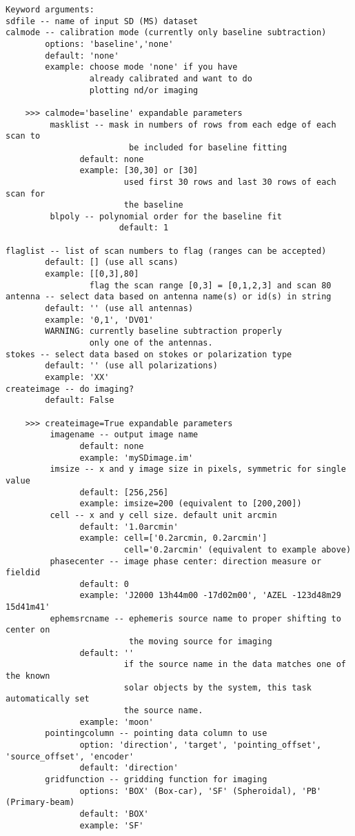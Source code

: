 \begin{verbatim}
Keyword arguments:
sdfile -- name of input SD (MS) dataset
calmode -- calibration mode (currently only baseline subtraction)
        options: 'baseline','none'
        default: 'none'
        example: choose mode 'none' if you have
                 already calibrated and want to do
                 plotting nd/or imaging 
    
    >>> calmode='baseline' expandable parameters
         masklist -- mask in numbers of rows from each edge of each scan to 
                         be included for baseline fitting
               default: none
               example: [30,30] or [30] 
                        used first 30 rows and last 30 rows of each scan for 
                        the baseline 
         blpoly -- polynomial order for the baseline fit
                       default: 1
                       
flaglist -- list of scan numbers to flag (ranges can be accepted)  
        default: [] (use all scans)
        example: [[0,3],80]
                 flag the scan range [0,3] = [0,1,2,3] and scan 80 
antenna -- select data based on antenna name(s) or id(s) in string
        default: '' (use all antennas)
        example: '0,1', 'DV01'
        WARNING: currently baseline subtraction properly 
                 only one of the antennas.
stokes -- select data based on stokes or polarization type 
        default: '' (use all polarizations)
        example: 'XX'
createimage -- do imaging? 
        default: False 
        
    >>> createimage=True expandable parameters
         imagename -- output image name
               default: none
               example: 'mySDimage.im'
         imsize -- x and y image size in pixels, symmetric for single value
               default: [256,256]
               example: imsize=200 (equivalent to [200,200])
         cell -- x and y cell size. default unit arcmin
               default: '1.0arcmin'
               example: cell=['0.2arcmin, 0.2arcmin']
                        cell='0.2arcmin' (equivalent to example above)
         phasecenter -- image phase center: direction measure or fieldid 
               default: 0
               example: 'J2000 13h44m00 -17d02m00', 'AZEL -123d48m29 15d41m41'
         ephemsrcname -- ephemeris source name to proper shifting to center on 
                         the moving source for imaging
               default: ''
                        if the source name in the data matches one of the known 
                        solar objects by the system, this task automatically set 
                        the source name. 
               example: 'moon' 
        pointingcolumn -- pointing data column to use
               option: 'direction', 'target', 'pointing_offset', 'source_offset', 'encoder' 
               default: 'direction'
        gridfunction -- gridding function for imaging
               options: 'BOX' (Box-car), 'SF' (Spheroidal), 'PB' (Primary-beam)
               default: 'BOX'
               example: 'SF'
               

\end{verbatim}
